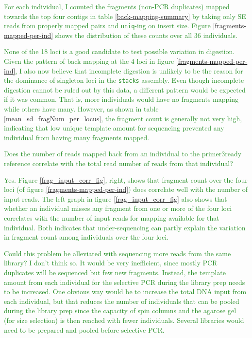 \documentclass{article}\usepackage[]{graphicx}\usepackage[]{color}
\newcommand{\roger}[1]{ \textcolor[named]{ForestGreen}{#1} }
\begin{document}
\roger{For each individual, I counted the fragments (non-PCR duplicates) mapped towards the top four contigs in table \ref{back-mapping-summary} by taking only SE reads from properly mapped pairs and \texttt{uniq}-ing on insert size. Figure \ref{fragments-mapped-per-ind} shows the distribution of these counts over all 36 individuals.}

\roger{None of the 18 loci is a good candidate to test possible variation in digestion. Given the pattern of back mapping at the 4 loci in figure \ref{fragments-mapped-per-ind}, I also now believe that incomplete digestion is unlikely to be the reason for the dominance of singleton loci in the \texttt{stacks} assembly. Even though incomplete digestion cannot be ruled out by this data, a different pattern would be expected if it was common. That is, more individuals would have no fragments mapping while others have many. However, as shown in table \ref{mean_sd_fragNum_per_locus}, the fragment count is generally not very high, indicating that low unique template amount for sequencing prevented any individual from having many fragments mapped.}

\roger{Does the number of reads mapped back from an individual to the primer3ready reference correlate with the total read number of reads from that individual?}

\roger{Yes. Figure \ref{frag_input_corr_fig}, right, shows that fragment count over the four loci (of figure \ref{fragments-mapped-per-ind}) does correlate well with the number of input reads. The left graph in figure \ref{frag_input_corr_fig} also shows that whether an individual misses any fragment from one or more of the four loci correlates with the number of input reads for mapping available for that individual. Both indicates that under-sequencing can partly explain the variation in fragment count among individuals over the four loci. }

\roger{Could this problem be alleviated with sequencing more reads from the same library? I don't think so. It would be very inefficient, since mostly PCR duplicates will be sequenced but few new fragments. Instead, the template amount from each individual for the selective PCR during the library prep needs to be increased. One obvious way would be to increase the total DNA input from each individual, but that reduces the number of individuals that can be pooled during the library prep since the capacity of spin columns and the agarose gel (for size selection) is then reached with fewer individuals. Several libraries would need to be prepared and pooled before selective PCR.
}
\end{document}
